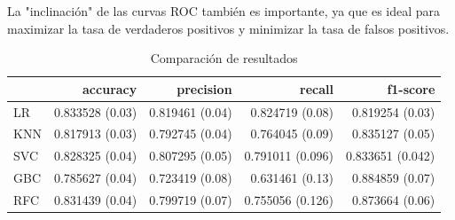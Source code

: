 \documentclass[12pt,twoside]{report}
\begin{document}
La "inclinación" de las curvas ROC también es importante, ya que es ideal para maximizar la tasa de verdaderos positivos y minimizar la tasa de falsos positivos.

\begin{table}[ht]
\begin{center}
\begin{tabular}{lrrrr}
\toprule
{} &  accuracy &precision &    recall &  f1-score \\
\midrule
LR &  0.833528 (0.03) &  0.819461 (0.04) &  0.824719 (0.08) &  0.819254 (0.03) \\
KNN &   0.817913 (0.03) &  0.792745 (0.04)&  0.764045 (0.09) &  0.835127 (0.05) \\
SVC     &   0.828325 (0.04) &  0.807295 (0.05) &  0.791011 (0.096) &   0.833651 (0.042) \\
GBC    &   0.785627 (0.04) & 0.723419 (0.08) &  0.631461 (0.13) &  0.884859 (0.07) \\
RFC    &   0.831439 (0.04) &   0.799719 (0.07) &  0.755056 (0.126) &  0.873664 (0.06)\\
\bottomrule
\end{tabular}
\end{center}
\caption{Comparación de resultados}
\label{comp:general}
\end{table}
\end{document}
